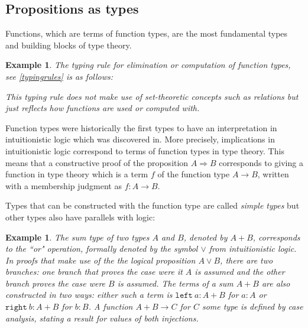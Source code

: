 \documentclass[12pt,a4paper,twoside,xetex]{book}
\newcommand{\keyword}[1]{\emph{#1}\index{#1}}
\newtheorem{example}[theorem]{Example}
\begin{document}
\subsection{Propositions as types}\label{curryhoward}

Functions, which are terms of function types, are the most fundamental types and 
building blocks of type theory. 

\begin{example}
The typing rule for elimination or computation of function types, see 
\cref{typingrules} is as follows:
\begin{prooftree}
    \end{prooftree}
This typing rule does not make use of set-theoretic concepts such as relations 
but just reflects how functions are used or computed with.
\end{example}
    
    
Function types were historically the first types to have an interpretation in 
intuitionistic logic \cite{Heyting1930} which was discovered 
in\cite{Curry1934Nov}. More precisely, implications in intuitionistic logic 
correspond to terms of function types in type theory. This means that a 
constructive proof of the proposition $A \Rightarrow B$ corresponds to giving a 
function  in type theory which is a term $f$ of the function type $ A 
\rightarrow B$, written with a membership judgment as $f: A \rightarrow B$. 

Types that can be constructed with the function type are called \keyword{simple 
types} but other types also have parallels with logic:

\begin{example}
The \keyword{sum type} of two types $A$ and $B$, denoted by $A+B$, corresponds 
to the ``or" operation, formally denoted by the symbol $\vee$ from 
intuitionistic logic. In proofs that make use of the the logical proposition $A 
\vee B$, there are two branches: one branch that proves the case were it  
$A$ is assumed and the other branch proves the case were $B$ is assumed. The terms of a sum 
$A+B$ are also constructed in two ways: either such a term is $\texttt{left}\ 
a:A+B$ for $a:A$ or $\texttt{right}\ b:A+B$ for $b:B$. A function 
$A+B\rightarrow C$ for $C$ some type is defined by case analysis, stating a 
result for values of both injections.
\end{example}
\end{document}
